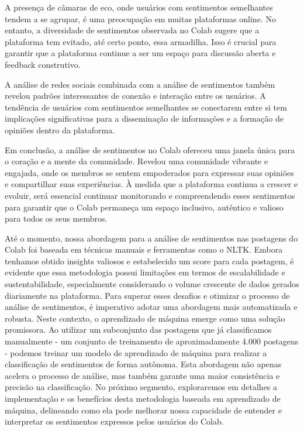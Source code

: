 A presença de câmaras de eco, onde usuários com sentimentos semelhantes tendem a se agrupar, é uma preocupação em muitas plataformas online. No entanto, a diversidade de sentimentos observada no Colab sugere que a plataforma tem evitado, até certo ponto, essa armadilha. Isso é crucial para garantir que a plataforma continue a ser um espaço para discussão aberta e feedback construtivo.

A análise de redes sociais combinada com a análise de sentimentos também revelou padrões interessantes de conexão e interação entre os usuários. A tendência de usuários com sentimentos semelhantes se conectarem entre si tem implicações significativas para a disseminação de informações e a formação de opiniões dentro da plataforma.

Em conclusão, a análise de sentimentos no Colab ofereceu uma janela única para o coração e a mente da comunidade. Revelou uma comunidade vibrante e engajada, onde os membros se sentem empoderados para expressar suas opiniões e compartilhar suas experiências. À medida que a plataforma continua a crescer e evoluir, será essencial continuar monitorando e compreendendo esses sentimentos para garantir que o Colab permaneça um espaço inclusivo, autêntico e valioso para todos os seus membros.

Até o momento, nossa abordagem para a análise de sentimentos nas postagens do Colab foi baseada em técnicas manuais e ferramentas como o NLTK. Embora tenhamos obtido insights valiosos e estabelecido um score para cada postagem, é evidente que essa metodologia possui limitações em termos de escalabilidade e sustentabilidade, especialmente considerando o volume crescente de dados gerados diariamente na plataforma. Para superar esses desafios e otimizar o processo de análise de sentimentos, é imperativo adotar uma abordagem mais automatizada e robusta. Neste contexto, o aprendizado de máquina emerge como uma solução promissora. Ao utilizar um subconjunto das postagens que já classificamos manualmente - um conjunto de treinamento de aproximadamente 4.000 postagens - podemos treinar um modelo de aprendizado de máquina para realizar a classificação de sentimentos de forma autônoma. Esta abordagem não apenas acelera o processo de análise, mas também garante uma maior consistência e precisão na classificação. No próximo segmento, exploraremos em detalhes a implementação e os benefícios desta metodologia baseada em aprendizado de máquina, delineando como ela pode melhorar nossa capacidade de entender e interpretar os sentimentos expressos pelos usuários do Colab.

